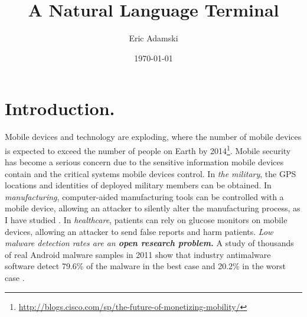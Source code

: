\documentclass[12pt]{article}
\title{A Natural Language Terminal}
\author{Eric Adamski}
\date{\today}
\begin{document}
\maketitle

\section{Introduction.}
Mobile devices and technology are exploding,
where the number of mobile devices
is expected to exceed the number of people on Earth by
2014\footnote{\url{http://blogs.cisco.com/sp/the-future-of-monetizing-mobility/}}.
Mobile security has become a serious concern due to the sensitive
information mobile devices contain and the critical systems mobile
devices control. %
In {\it the military}, the GPS locations and identities of
deployed military members can be obtained.
In {\it manufacturing}, computer-aided manufacturing tools can be
controlled with a mobile device,
allowing an attacker to silently alter the manufacturing process,
as I have studied \cite{turner2013bad}.
In {\it healthcare}, patients can rely on glucose monitors on
mobile devices, allowing an attacker to send false reports and harm patients.
\textit{Low malware detection rates are an \textbf{open research problem.}}
A study of thousands of real Android malware samples in 2011 show
that industry antimalware software detect
79.6\% of the malware in the best case and
20.2\% in the worst case \cite{zhou2012dissecting}.

\newpage


\end{document}
